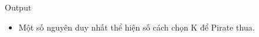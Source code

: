 Output
\begin{itemize}
	\item     Một số nguyên duy nhất thể hiện số cách chọn K để Pirate thua.   
\end{itemize}